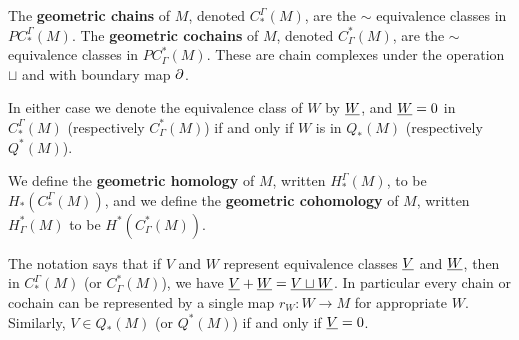 \begin{definition}
The \textbf{geometric chains} of $M$, denoted $C^\Gamma_*(M)$, are the $\sim$ equivalence classes in $PC^\Gamma_*(M)$.
The \textbf{geometric cochains} of $M$, denoted $C_\Gamma^*(M)$, are the $\sim$ equivalence classes in $PC_\Gamma^*(M)$.
These are chain complexes under the operation $\sqcup$ and with boundary map $\partial$.

In either case we denote the equivalence class of $W$ by $\underline{W}$, and $\underline{W} = 0$ in $C^\Gamma_*(M)$ (respectively $C_\Gamma^*(M)$) if and only if $W$ is in $Q_*(M)$ (respectively $Q^*(M)$).

We define the \textbf{geometric homology} of $M$, written $H_*^\Gamma(M)$, to be $H_*(C^\Gamma_*(M))$, and
we define the \textbf{geometric cohomology} of $M$, written $H^*_\Gamma(M)$ to be $H^*(C_\Gamma^*(M))$.
\end{definition}

The notation says that if $V$ and $W$ represent equivalence classes $\underline{V}$ and $\underline{W}$, then in $C_*^{\Gamma}(M)$ (or $C^*_\Gamma(M)$), we have $\underline{V}+\underline{W} = \underline{V \sqcup W}$. In particular every chain or cochain can be represented by a single map $r_W \colon W \to M$ for appropriate $W$. Similarly, $V \in Q_*(M)$ (or $Q^*(M)$) if and only if $\underline{V} = 0$.


